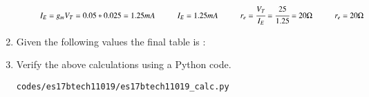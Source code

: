 \begin{enumerate}[label=\thesubsection.\arabic*.,ref=\thesubsection.\theenumi]
\begin{align}
        \vspace{1cm}

\hspace{1cm}       I_{E} = g_{m}V_{T}
             = 0.05 * 0.025
             = 1.25 mA
            
            \vspace{0.5cm}
            
\hspace{1cm}         I_{E} = 1.25 mA
     
     \vspace{1cm}
     
\hspace{1cm}        r_{e} = \cfrac{V_{T}}{I_{E}}
              = \cfrac{25}{1.25}
              = 20 \ohm
 
 \vspace{0.5cm}
 
\hspace{1cm}        r_{e} = 20 \ohm
        
        \vspace{1cm}
        
\end{align}

\vspace{20cm}

\item
Given the following values the final table is : 
\begin{table}[!ht]
\centering

\caption{}
\label{table: Output_Table}
\end{table}


\item
Verify the above calculations using a Python code.

\solution
\begin{lstlisting}
codes/es17btech11019/es17btech11019_calc.py
\end{lstlisting}

\end{enumerate}